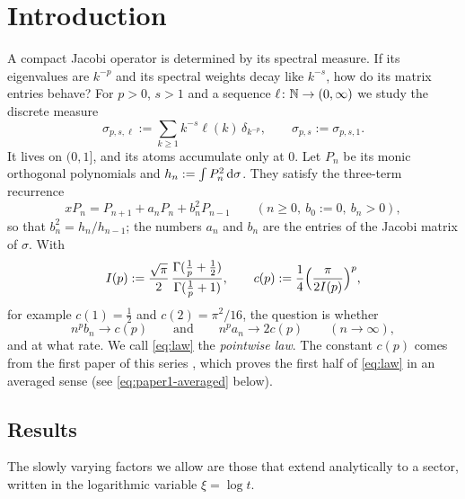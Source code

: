 \maketitle

\section{Introduction}\label{sec:intro}

A compact Jacobi operator is determined by its spectral measure. If its eigenvalues are $k^{-p}$ and its spectral
weights decay like $k^{-s}$, how do its matrix entries behave? For $p>0$, $s>1$ and a sequence
$\ell\colon\mathbb{N}\to(0,\infty)$ we study the discrete measure
\begin{equation}\label{eq:sigma}
  \sigma_{p,s,\ell}:=\sum_{k\ge1}k^{-s}\ell(k)\,\delta_{k^{-p}},\qquad \sigma_{p,s}:=\sigma_{p,s,1}.
\end{equation}
It lives on $(0,1]$, and its atoms accumulate only at $0$. Let $P_n$ be its monic orthogonal polynomials and
$h_n:=\int P_n^2\,\mathrm{d}\sigma$. They satisfy the three-term recurrence
\begin{equation}\label{eq:jacobi}
  xP_n=P_{n+1}+a_nP_n+b_n^2P_{n-1}\qquad(n\ge0,\ b_0:=0,\ b_n>0),
\end{equation}
so that $b_n^2=h_n/h_{n-1}$; the numbers $a_n$ and $b_n$ are the entries of the Jacobi matrix of $\sigma$. With
\begin{equation}\label{eq:cp}
  I(p):=\frac{\sqrt\pi}{2}\,\frac{\Gamma(\frac1p+\frac12)}{\Gamma(\frac1p+1)},\qquad
  c(p):=\frac14\Bigl(\frac{\pi}{2I(p)}\Bigr)^{p},
\end{equation}
for example $c(1)=\frac12$ and $c(2)=\pi^2/16$, the question is whether
\begin{equation}\label{eq:law}
  n^pb_n\longrightarrow c(p)\qquad\text{and}\qquad n^pa_n\longrightarrow2c(p)\qquad(n\to\infty),
\end{equation}
and at what rate. We call \eqref{eq:law} the \emph{pointwise law}. The constant $c(p)$ comes from the first paper of this series
\cite{Paper1}, which proves the first half of \eqref{eq:law} in an averaged sense (see \eqref{eq:paper1-averaged}
below).

\subsection{Results}\label{sec:results}
The slowly varying factors we allow are those that extend analytically to a sector, written in the logarithmic
variable $\xi=\log t$.

